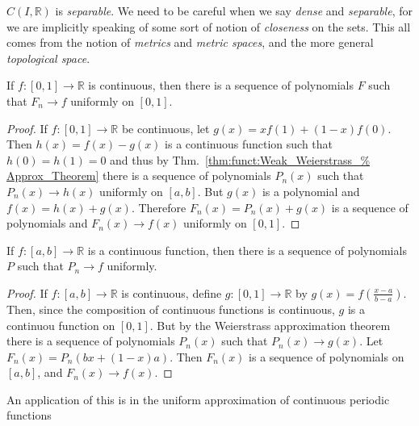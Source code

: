     $C(I,\mathbb{R})$ is \textit{separable}. We need
    to be careful when we say \textit{dense} and
    \textit{separable}, for we are implicitly speaking
    of some sort of notion of \textit{closeness} on the
    sets. This all comes from the notion of
    \textit{metrics} and \textit{metric spaces},
    and the more general \textit{topological space}.
    \begin{theorem}
        \label{thm:Funct:Weierstrass_%
               Approx_on_unit_interval}
        If $f:[0,1]\rightarrow\mathbb{R}$ is
        continuous, then there is a sequence
        of polynomials $F$ such that
        $F_{n}\rightarrow{f}$ uniformly on $[0,1]$.
    \end{theorem}
    \begin{proof}
        If $f:[0,1]\rightarrow\mathbb{R}$ be
        continuous, let
        $g(x)=xf(1)+(1-x)f(0)$. Then
        $h(x)=f(x)-g(x)$ is a continuous function
        such that $h(0)=h(1)=0$ and thus by
        Thm.~\ref{thm:funct:Weak_Weierstrass_%
                  Approx_Theorem}
        there is a sequence of polynomials
        $P_{n}(x)$ such that
        $P_{n}(x)\rightarrow{h(x)}$
        uniformly on $[a,b]$.
        But $g(x)$ is a polynomial and
        $f(x)=h(x)+g(x)$. Therefore
        $F_{n}(x)=P_{n}(x)+g(x)$ is a sequence
        of polynomials and
        $F_{n}(x)\rightarrow{f(x)}$
        uniformly on $[0,1]$.
    \end{proof}
    \begin{theorem}
        If $f:[a,b]\rightarrow\mathbb{R}$ is a
        continuous function, then there is a sequence
        of polynomials $P$ such that
        $P_{n}\rightarrow{f}$ uniformly.
    \end{theorem}
    \begin{proof}
        If $f:[a,b]\rightarrow\mathbb{R}$ is
        continuous, define
        $g:[0,1]\rightarrow\mathbb{R}$ by
        $g(x)=f(\frac{x-a}{b-a})$. Then, since
        the composition of continuous functions
        is continuous, $g$ is a continuou function
        on $[0,1]$. But by the Weierstrass
        approximation theorem there is a sequence
        of polynomials $P_{n}(x)$ such that
        $P_{n}(x)\rightarrow{g(x)}$. Let
        $F_{n}(x)=P_{n}(bx+(1-x)a)$. Then
        $F_{n}(x)$ is a sequence of polynomials
        on $[a,b]$, and $F_{n}(x)\rightarrow{f(x)}$.
    \end{proof}
    An application of this is in the uniform
    approximation of continuous periodic functions
